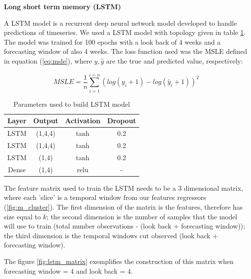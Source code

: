 \documentclass[12pt]{report}
\begin{document}
\begin{description}
 \item \textbf{Long short term memory (LSTM)}
 
 A LSTM model is a recurrent deep neural network model developed to handle predictions of timeseries. We used a LSTM model with topology given in table \ref{tab:lstm}. The model was trained for 100 epochs with a look back of 4 weeks and a forecasting window of also 4 weeks. 
The loss function used was the MSLE defined in equation (\ref{eq:msle}), where $y, \hat{y}$ are the true and predicted value, respectively:

\begin{equation}
MSLE = \dfrac{1}{n} \sum_{i=1}^{i=n} (log(y_i +1) - log(\hat{y}_i +1))^{2}
\label{eq:msle}
\end{equation}

\begin{table}
\begin{center}
\begin{tabular}{cccc}
  \textbf{Layer} & \textbf{Output} & \textbf{Activation} & \textbf{Dropout}\\
  \hline
  LSTM  & (1,4,4) & tanh & 0.2 \\
  LSTM  & (1,4,4) & tanh & 0.2\\
  LSTM  & (1,4) & tanh & 0.2\\
  Dense & (1,4) & relu & - \\
  \hline
\end{tabular}
\caption{Parameters used to build LSTM model}
\label{tab:lstm}
\end{center}
\end{table}

The feature matrix used to train the LSTM needs to be a 3 dimensional matrix, where each 'slice' is a temporal window from our features regressors (\ref{fig:m_cluster}). The first dimension of the matrix is the features, therefore has size equal to $k$; the second dimension is the number of samples that the model will use to train (total number observations - (look back + forecasting window)); the third dimension is the temporal windows cut observed (look back + forecasting window).

The figure \ref{fig:lstm_matrix} exemplifies the construction of this matrix when forecasting window = 4 and look back = 4.


\end{description}
\end{document}
